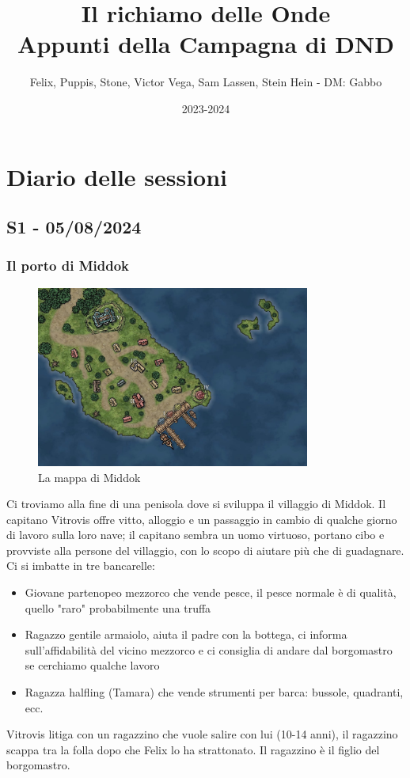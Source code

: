 \documentclass[letterpaper,twocolumn,openany, nodeprecatedcode, nomultitoc]{dndbook}
\title{Il richiamo delle Onde \\
\large Appunti della Campagna di DND}
\author{Felix, Puppis, Stone, Victor Vega, Sam Lassen, Stein Hein - DM: Gabbo}
\date{2023-2024}
\begin{document}
\frontmatter

\maketitle

\tableofcontents


\mainmatter%

\chapter{Diario delle sessioni}


\section{S1 - 05/08/2024}
\subsection{Il porto di Middok}
\begin{figure}
\centering
\includegraphics[width=9cm]{./mappe/mappa-middok.png}
\caption{La mappa di Middok}
\label{middok}
\end{figure}


Ci troviamo alla fine di una penisola dove si sviluppa il villaggio di Middok.
Il capitano Vitrovis offre vitto, alloggio e un passaggio in cambio di qualche giorno di lavoro sulla loro nave; il capitano sembra un uomo virtuoso, portano cibo e provviste alla persone del villaggio, con lo scopo di aiutare più che di guadagnare.
Ci si imbatte in tre bancarelle:
\begin{itemize}
  \item Giovane partenopeo mezzorco che vende pesce, il pesce normale è di qualità, quello "raro" probabilmente una truffa
  \item Ragazzo gentile armaiolo, aiuta il padre con la bottega, ci informa sull'affidabilità del vicino mezzorco e ci consiglia di andare dal borgomastro se cerchiamo qualche lavoro
  \item Ragazza halfling (Tamara) che vende strumenti per barca: bussole, quadranti, ecc.
\end{itemize}
Vitrovis litiga con un ragazzino che vuole salire con lui (10-14 anni), il ragazzino scappa tra la folla dopo che Felix lo ha strattonato. Il ragazzino è il figlio del borgomastro.
\end{document}

